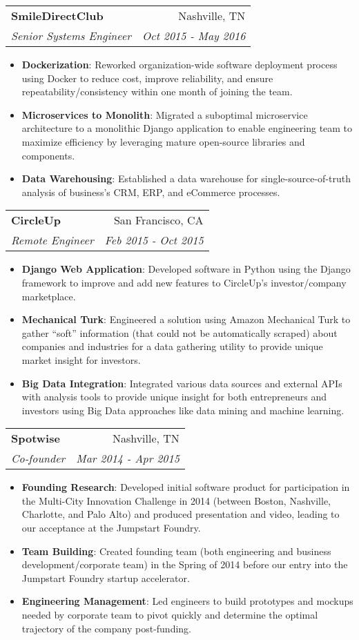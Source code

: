 \documentclass[letterpaper,10pt]{article}
\makeatletter
\newcommand{\resumeItem}[2]{
  \item\small{
    \textbf{#1}{: #2 \vspace{-2pt}}
  }
}
\newcommand{\resumeSubheading}[4]{
  \vspace{-1pt}\item
    \begin{tabular*}{0.97\textwidth}{l@{\extracolsep{\fill}}r}
      \textbf{#1} & #2 \\
      \textit{\small#3} & \textit{\small #4} \\
    \end{tabular*}\vspace{-5pt}
}
\newcommand{\resumeItemListStart}{\begin{itemize}}
\newcommand{\resumeItemListEnd}{\end{itemize}\vspace{-5pt}}
\makeatother
\begin{document}
    \resumeSubheading
      {SmileDirectClub}{Nashville, TN}
      {Senior Systems Engineer}{Oct 2015 - May 2016}
      \resumeItemListStart
        \resumeItem{Dockerization}
          {Reworked organization-wide software deployment process using Docker to reduce cost, improve reliability, and ensure repeatability/consistency within one month of joining the team.}
        \resumeItem{Microservices to Monolith}
          {Migrated a suboptimal microservice architecture to a monolithic Django application to enable engineering team to maximize efficiency by leveraging mature open-source libraries and components.}
       \resumeItem{Data Warehousing}
          {Established a data warehouse for single-source-of-truth analysis of business's CRM, ERP, and eCommerce processes.}
      \resumeItemListEnd
      
    \resumeSubheading
      {CircleUp}{San Francisco, CA}
      {Remote Engineer}{Feb 2015 - Oct 2015}
      \resumeItemListStart
        \resumeItem{Django Web Application}
          {Developed software in Python using the Django framework to improve and add new features to CircleUp’s investor/company marketplace.}
        \resumeItem{Mechanical Turk}
          {Engineered a solution using Amazon Mechanical Turk to gather “soft” information (that could not be automatically scraped) about companies and industries for a data gathering utility to provide unique market insight for investors.}
        \resumeItem{Big Data Integration}
          {Integrated various data sources and external APIs with analysis tools to provide unique insight for both entrepreneurs and investors using Big Data approaches like data mining and machine learning.}
      \resumeItemListEnd

    \resumeSubheading
      {Spotwise}{Nashville, TN}
      {Co-founder}{Mar 2014 - Apr 2015}
      \resumeItemListStart
        \resumeItem{Founding Research}
          {Developed initial software product for participation in the Multi-City Innovation Challenge in 2014 (between Boston, Nashville, Charlotte, and Palo Alto) and produced presentation and video, leading to our acceptance at the Jumpstart Foundry.}
        \resumeItem{Team Building}
          {Created founding team (both engineering and business development/corporate team) in the Spring of 2014 before our entry into the Jumpstart Foundry startup accelerator.}
        \resumeItem{Engineering Management}
          {Led engineers to build prototypes and mockups needed by corporate team to pivot quickly and determine the optimal trajectory of the company post-funding.}
      \resumeItemListEnd
\end{document}
